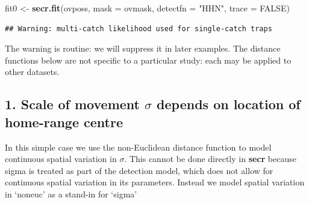\documentclass[
]{book}
\newenvironment{Shaded}{\begin{snugshade}}{\end{snugshade}}
\newcommand{\AttributeTok}[1]{\textcolor[rgb]{0.13,0.29,0.53}{#1}}
\newcommand{\ConstantTok}[1]{\textcolor[rgb]{0.56,0.35,0.01}{#1}}
\newcommand{\FunctionTok}[1]{\textcolor[rgb]{0.13,0.29,0.53}{\textbf{#1}}}
\newcommand{\NormalTok}[1]{#1}
\newcommand{\OtherTok}[1]{\textcolor[rgb]{0.56,0.35,0.01}{#1}}
\newcommand{\StringTok}[1]{\textcolor[rgb]{0.31,0.60,0.02}{#1}}
\begin{document}
\begin{Shaded}
\begin{Highlighting}[]
\NormalTok{fit0 }\OtherTok{\textless{}{-}} \FunctionTok{secr.fit}\NormalTok{(ovposs, }\AttributeTok{mask =}\NormalTok{ ovmask, }\AttributeTok{detectfn =} \StringTok{"HHN"}\NormalTok{, }
    \AttributeTok{trace =} \ConstantTok{FALSE}\NormalTok{)}
\end{Highlighting}
\end{Shaded}

\begin{verbatim}
## Warning: multi-catch likelihood used for single-catch traps
\end{verbatim}

The warning is routine: we will suppress it in later examples. The distance functions below are not specific to a particular study: each may be applied to other datasets.

\subsection{\texorpdfstring{1. Scale of movement \(\sigma\) depends on location of home-range centre}{1. Scale of movement \textbackslash sigma depends on location of home-range centre}}\label{scale-of-movement-sigma-depends-on-location-of-home-range-centre}

In this simple case we use the non-Euclidean distance function to model continuous spatial variation in \(\sigma\). This cannot be done directly in \textbf{secr} because sigma is treated as part of the detection model, which does not allow for continuous spatial variation in its parameters. Instead we model spatial variation in `noneuc' as a stand-in for `sigma'
\end{document}
